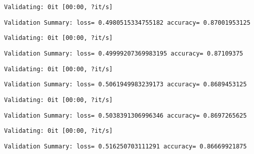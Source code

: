 \documentclass[11pt]{article}
\begin{document}
    
    \begin{Verbatim}[commandchars=\\\{\}]
Validating: 0it [00:00, ?it/s]
    \end{Verbatim}

    
    \begin{Verbatim}[commandchars=\\\{\}]
Validation Summary: loss= 0.4980515334755182 accuracy= 0.87001953125
    \end{Verbatim}

    
    \begin{Verbatim}[commandchars=\\\{\}]
Validating: 0it [00:00, ?it/s]
    \end{Verbatim}

    
    \begin{Verbatim}[commandchars=\\\{\}]
Validation Summary: loss= 0.49999207369983195 accuracy= 0.87109375
    \end{Verbatim}

    
    \begin{Verbatim}[commandchars=\\\{\}]
Validating: 0it [00:00, ?it/s]
    \end{Verbatim}

    
    \begin{Verbatim}[commandchars=\\\{\}]
Validation Summary: loss= 0.5061949983239173 accuracy= 0.8689453125
    \end{Verbatim}

    
    \begin{Verbatim}[commandchars=\\\{\}]
Validating: 0it [00:00, ?it/s]
    \end{Verbatim}

    
    \begin{Verbatim}[commandchars=\\\{\}]
Validation Summary: loss= 0.5038391306996346 accuracy= 0.8697265625
    \end{Verbatim}

    
    \begin{Verbatim}[commandchars=\\\{\}]
Validating: 0it [00:00, ?it/s]
    \end{Verbatim}

    
    \begin{Verbatim}[commandchars=\\\{\}]
Validation Summary: loss= 0.516250703111291 accuracy= 0.86669921875
    \end{Verbatim}
\end{document}
